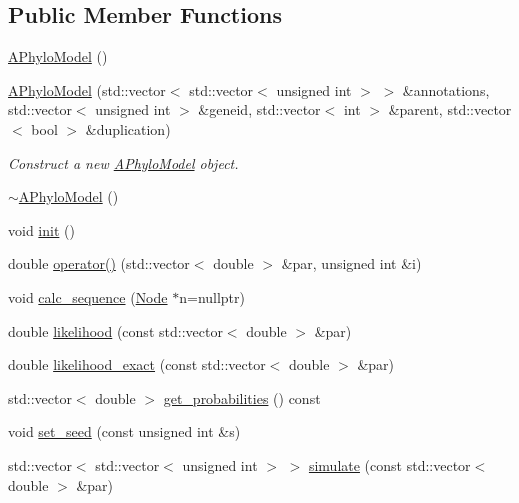\subsection*{Public Member Functions}
\begin{DoxyCompactItemize}
\item 
\hyperlink{class_a_phylo_model_a5055699d05235bbefb283298d9dee75d}{A\+Phylo\+Model} ()
\item 
\hyperlink{class_a_phylo_model_a4c0005c106a12f1b11ccd9f5ceac8d9c}{A\+Phylo\+Model} (std\+::vector$<$ std\+::vector$<$ unsigned int $>$ $>$ \&annotations, std\+::vector$<$ unsigned int $>$ \&geneid, std\+::vector$<$ int $>$ \&parent, std\+::vector$<$ bool $>$ \&duplication)
\begin{DoxyCompactList}\small\item\em Construct a new \hyperlink{class_a_phylo_model}{A\+Phylo\+Model} object. \end{DoxyCompactList}\item 
\hyperlink{class_a_phylo_model_ab8b8523e07df92859e5d4289341da72f}{$\sim$\+A\+Phylo\+Model} ()
\item 
void \hyperlink{class_a_phylo_model_a45a7af583f9619bce5d88b15303a73e6}{init} ()
\item 
double \hyperlink{class_a_phylo_model_a9b3390c29ea7a3283e68e9a059b94138}{operator()} (std\+::vector$<$ double $>$ \&par, unsigned int \&i)
\item 
void \hyperlink{class_a_phylo_model_a4a06f02ecd5da1e1b5609fec24318282}{calc\+\_\+sequence} (\hyperlink{class_node}{Node} $\ast$n=nullptr)
\item 
double \hyperlink{class_a_phylo_model_a66fced3b89fe385862318621855fa605}{likelihood} (const std\+::vector$<$ double $>$ \&par)
\item 
double \hyperlink{class_a_phylo_model_a22e8844816076c6f13d0371b1b62a22a}{likelihood\+\_\+exact} (const std\+::vector$<$ double $>$ \&par)
\item 
std\+::vector$<$ double $>$ \hyperlink{class_a_phylo_model_a3368d03919454f68f0cb5bd888f983a1}{get\+\_\+probabilities} () const
\item 
void \hyperlink{class_a_phylo_model_a5f3faed4bad372764c056d1686508d6e}{set\+\_\+seed} (const unsigned int \&s)
\item 
std\+::vector$<$ std\+::vector$<$ unsigned int $>$ $>$ \hyperlink{class_a_phylo_model_ac75bb5a2f14d104733e2c194ae210986}{simulate} (const std\+::vector$<$ double $>$ \&par)
\end{DoxyCompactItemize}
